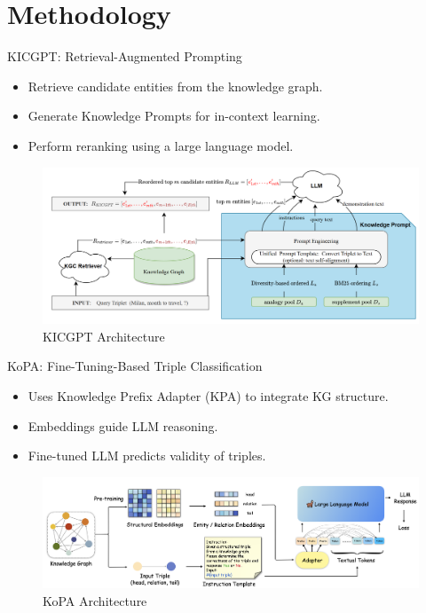 \documentclass[aspectratio=169,xcolor=dvipsnames]{beamer}
\begin{document}
\section{Methodology}
\begin{frame}{KICGPT: Retrieval-Augmented Prompting}
    \begin{itemize}
        \item Retrieve candidate entities from the knowledge graph.
        \item Generate Knowledge Prompts for in-context learning.
        \item Perform reranking using a large language model.
    \end{itemize}
    \begin{figure}[h]
        \centering
        \includegraphics[width=0.8\linewidth]{images/KICGPTarchitecture.png}
        \caption{KICGPT Architecture}
    \end{figure}
\end{frame}

\begin{frame}{KoPA: Fine-Tuning-Based Triple Classification}
    \begin{itemize}
        \item Uses Knowledge Prefix Adapter (KPA) to integrate KG structure.
        \item Embeddings guide LLM reasoning.
        \item Fine-tuned LLM predicts validity of triples.
    \end{itemize}
    \begin{figure}[h]
        \centering
        \includegraphics[width=0.8\linewidth]{images/KoPAarchitecture.png}
        \caption{KoPA Architecture}
    \end{figure}
\end{frame}
\end{document}
